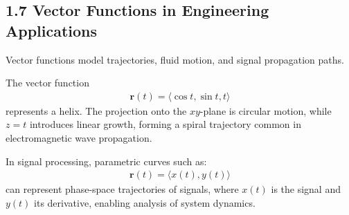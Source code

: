
\subsection*{1.7 Vector Functions in Engineering Applications}

Vector functions model trajectories, fluid motion, and signal propagation paths.

\begin{examplebox}
    The vector function
    \begin{align*}
        \mathbf{r}(t)=\langle \cos t, \sin t, t\rangle
    \end{align*}
    represents a helix. The projection onto the $xy$-plane is circular motion, while $z=t$ introduces linear growth, forming a spiral trajectory common in electromagnetic wave propagation.
\end{examplebox}

\begin{examplebox}
    In signal processing, parametric curves such as:
    \begin{align*}
        \mathbf{r}(t)=\langle x(t), y(t) \rangle
    \end{align*}
    can represent phase-space trajectories of signals, where $x(t)$ is the signal and $y(t)$ its derivative, enabling analysis of system dynamics.
\end{examplebox}